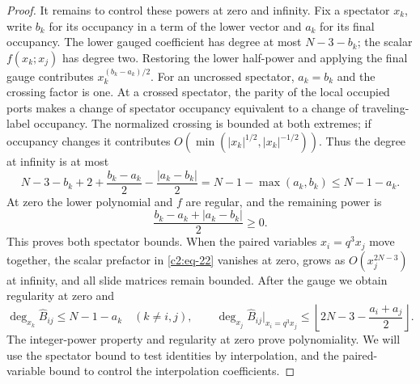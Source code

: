 \begin{proof}
It remains to control these powers at zero and infinity. Fix a
spectator \(x_k\), write \(b_k\) for its occupancy in a term of the
lower vector and \(a_k\) for its final occupancy. The lower gauged
coefficient has degree at most \(N-3-b_k\); the scalar
\(f(x_k;x_j)\) has degree two. Restoring the lower half-power and
applying the final gauge contributes \(x_k^{(b_k-a_k)/2}\).
For an uncrossed spectator, \(a_k=b_k\) and the crossing factor is one.
At a crossed spectator, the parity of the local occupied ports makes a
change of spectator occupancy equivalent to a change of traveling-label
occupancy. The normalized crossing is bounded at both extremes; if
occupancy changes it contributes
\(O(\min(|x_k|^{1/2},|x_k|^{-1/2}))\). Thus the degree at infinity is
at most
\[
 N-3-b_k+2+\frac{b_k-a_k}{2}-\frac{|a_k-b_k|}{2}
 =N-1-\max(a_k,b_k)\le N-1-a_k.
\]
At zero the lower polynomial and \(f\) are regular, and the remaining
power is
\[
 \frac{b_k-a_k+|a_k-b_k|}{2}\ge0.
\]
This proves both spectator bounds. When the paired variables \(x_i=q^3x_j\) move
together, the scalar prefactor in \eqref{c2:eq-22} vanishes at zero,
grows as \(O(x_j^{2N-3})\) at infinity, and all slide matrices remain
bounded. After the gauge we obtain regularity at zero and
\[
 \deg_{x_k}\widehat B_{ij}\le N-1-a_k\quad(k\ne i,j),
 \qquad
 \deg_{x_j}\widehat B_{ij}\big|_{x_i=q^3x_j}
 \le\left\lfloor2N-3-\frac{a_i+a_j}{2}\right\rfloor.
\]
The integer-power property and regularity at zero prove polynomiality.
We will use the spectator bound to test identities by interpolation,
and the paired-variable bound to control the interpolation coefficients.


\end{proof}
